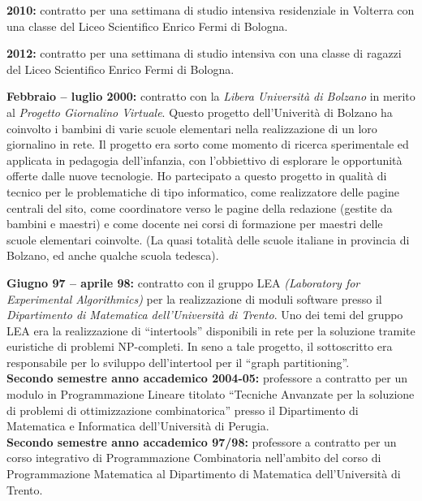 \noindent
{\bf 2010:}
contratto per una settimana di studio intensiva residenziale in Volterra
con una classe del Liceo Scientifico Enrico Fermi di Bologna. 

\noindent
{\bf 2012:}
contratto per una settimana di studio intensiva
con una classe di ragazzi del Liceo Scientifico Enrico Fermi di Bologna. 

\noindent
{\bf Febbraio -- luglio 2000:}
contratto con la {\em Libera Universit\`a di Bolzano}
in merito al {\em Progetto Giornalino Virtuale}.
Questo progetto dell'Univerit\`a di Bolzano
ha coinvolto i bambini di varie scuole elementari
nella realizzazione di un loro giornalino in rete.
Il progetto era sorto
come momento di ricerca sperimentale ed applicata
in pedagogia dell'infanzia, con l'obbiettivo
di esplorare le opportunit\`a offerte dalle nuove tecnologie. 
Ho partecipato a questo progetto
in qualit\`a di tecnico
per le problematiche di tipo informatico,
come realizzatore delle pagine centrali del sito,
come coordinatore verso le pagine della redazione (gestite da bambini
e maestri) e come docente nei corsi di formazione per
maestri delle scuole elementari coinvolte.
(La quasi totalit\`a delle scuole italiane in provincia di Bolzano,
ed anche qualche scuola tedesca).

\noindent
{\bf Giugno 97 -- aprile 98:}
contratto con il gruppo LEA {\em (Laboratory for Experimental Algorithmics)}
per la realizzazione di moduli software
presso il {\em Dipartimento di Matematica dell'Universit\`a di Trento}.
Uno dei temi del gruppo LEA
era la realizzazione di ``intertools''
disponibili in rete per la soluzione tramite euristiche
di problemi NP-completi.
In seno a tale progetto,
il sottoscritto era responsabile per lo sviluppo dell'intertool
per il ``graph partitioning''.\\

{\bf Secondo semestre anno accademico 2004-05:}
professore a contratto per un modulo in Programmazione Lineare
titolato ``Tecniche Anvanzate per la soluzione di problemi di ottimizzazione
combinatorica''
presso il Dipartimento di Matematica e Informatica
dell'Universit\`a di Perugia.\\

{\bf Secondo semestre anno accademico 97/98:}
professore a contratto per 
un corso integrativo di Programmazione Combinatoria
nell'ambito del corso di Programmazione Matematica
al Dipartimento di Matematica dell'Universit\`a di Trento.\\

